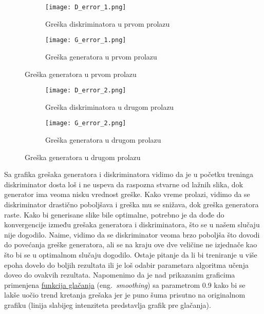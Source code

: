 \documentclass[a4paper]{article}
\begin{document}
 \begin{figure}[h!]
     \centering
     \begin{subfigure}{0.4\linewidth}
     \texttt{[image: D\_error\_1.png]}
     \caption{Greška diskriminatora u prvom prolazu}
     \end{subfigure}
     \begin{subfigure}{0.4\linewidth}
     \texttt{[image: G\_error\_1.png]}
     \caption{Greška generatora u prvom prolazu}
     \end{subfigure}
 \end{figure}
 
  \begin{figure}[h!]
     \centering
     \begin{subfigure}{0.4\linewidth}
     \texttt{[image: D\_error\_2.png]}
     \caption{Greška diskriminatora u drugom prolazu}
     \end{subfigure}
     \begin{subfigure}{0.4\linewidth}
     \texttt{[image: G\_error\_2.png]}
     \caption{Greška generatora u drugom prolazu}
     \end{subfigure}
 \end{figure}

Sa grafika grešaka generatora i diskriminatora vidimo da je u početku treninga diskriminator dosta loš i ne uspeva da raspozna stvarne od lažnih slika, dok generator ima veoma nisku vrednost greške. Kako vreme prolazi, vidimo da se diskriminator drastično poboljšava i greška mu se snižava, dok greška generatora raste. Kako bi generisane slike bile optimalne, potrebno je da dođe do konvergencije između grešaka generatora i diskriminatora, što se u našem slučaju nije dogodilo. Naime, vidimo da se diskriminator veoma brzo poboljša što dovodi do povećanja greške generatora, ali se na kraju ove dve veličine ne izjednače kao što bi se u optimalnom slučaju dogodilo. Ostaje pitanje da li bi treniranje u više epoha dovelo do boljih rezultata ili je loš odabir parametara algoritma učenja doveo do ovakvih rezultata. Napomenimo da je nad prikazanim graficima primenjena \href{https://github.com/tensorflow/tensorboard/blob/f801ebf1f9fbfe2baee1ddd65714d0bccc640fb1/tensorboard/plugins/scalar/vz_line_chart/vz-line-chart.ts#L42}{funkcija glačanja} (eng.~{\em smoothing}) sa parametrom 0.9 kako bi se lakše uočio trend kretanja grešaka jer je puno šuma prisutno na originalnom grafiku (linija slabijeg intenziteta predstavlja grafik pre glačanja).  
\end{document}
